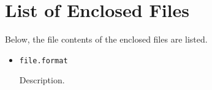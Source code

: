 \chapter{List of Enclosed Files}\label{app:Encl}
Below, the file contents of the enclosed files are listed.
\begin{itemize}
	\item \verb|file.format|\par
	Description.
\end{itemize}